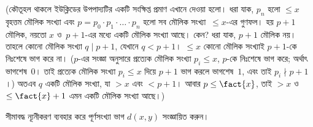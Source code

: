 \documentclass[../../../include/open-logic-section]{subfiles}
\begin{document}
(কৌতূহল থাকলে ইউক্লিডের উপপাদ্যটির একটি সংক্ষিপ্ত প্রমাণ এখানে দেওয়া
হলো। ধরা যাক, $p_n$ হলো $\le x$ বৃহত্তম মৌলিক সংখ্যা এবং
$p = p_0\cdot p_1 \cdot \dots \cdot p_n$ হলো সব মৌলিক সংখ্যা~$\le x$-এর
গুণফল। হয় $p+1$ মৌলিক, নয়তো $x$ ও~$p+1$-এর মধ্যে একটি মৌলিক সংখ্যা
আছে। কেন? ধরা যাক, $p+1$ মৌলিক নয়। তাহলে কোনো মৌলিক সংখ্যা
$q \mid p+1$, যেখানে $q < p+1$। $\le x$ কোনো মৌলিক সংখ্যাই $p+1$-কে
নিঃশেষে ভাগ করে না। ($p$-এর সংজ্ঞা অনুসারে প্রত্যেক মৌলিক সংখ্যা
$p_i \le x$, $p$-কে নিঃশেষে ভাগ করে; অর্থাৎ ভাগশেষ~$0$। তাই প্রত্যেক
মৌলিক সংখ্যা $p_i \le x$ দিয়ে $p+1$ ভাগ করলে ভাগশেষ~$1$, এবং তাই
$p_i \nmid p+1$।) অতএব $q$ একটি মৌলিক সংখ্যা, যা $> x$ এবং
$< p+1$। আবার $p \le \fact{x}$, তাই $> x$ ও $\le \fact{x}+1$ এমন
একটি মৌলিক সংখ্যা আছে।)

\begin{prob}
সীমাবদ্ধ ন্যূনীকরণ ব্যবহার করে পূর্ণসংখ্যা ভাগ $d(x, y)$ সংজ্ঞায়িত করুন।
\end{prob}
\end{document}
